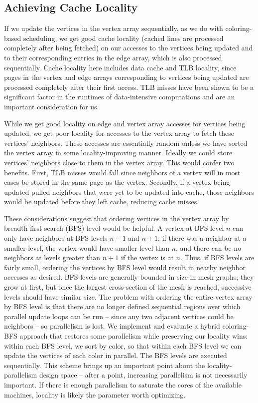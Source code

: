 \subsection{Achieving Cache Locality}
If we update the vertices in the vertex array sequentially, as we do with coloring-based scheduling, we get good cache locality (cached lines are processed completely after being fetched) on our accesses to the vertices being updated and to their corresponding entries in the edge array, which is also processed sequentially. Cache locality here includes data cache and TLB locality, since pages in the vertex and edge arrays corresponding to vertices being updated are processed completely after their first access. TLB misses have been shown to be a significant factor in the runtimes of data-intensive computations and are an important consideration for us.

While we get good locality on edge and vertex array accesses for vertices being updated, we get poor locality for accesses to the vertex array to fetch these vertices' neighbors. These accesses are essentially random unless we have sorted the vertex array in some locality-improving manner. Ideally we could store vertices' neighbors close to them in the vertex array. This would confer two benefits. First, TLB misses would fall since neighbors of a vertex will in most cases be stored in the same page as the vertex. Secondly, if a vertex being updated pulled neighbors that were yet to be updated into cache, those neighbors would be updated before they left cache, reducing cache misses.

These considerations suggest that ordering vertices in the vertex array by breadth-first search (BFS) level would be helpful. A vertex at BFS level $n$ can only have neighbors at BFS levels $n-1$ and $n+1$; if there was a neighbor at a smaller level, the vertex would have smaller level than $n$, and there can be no neighbors at levels greater than $n+1$ if the vertex is at $n$. Thus, if BFS levels are fairly small, ordering the vertices by BFS level would result in nearby neighbor accesses as desired. BFS levels are generally bounded in size in mesh graphs; they grow at first, but once the largest cross-section of the mesh is reached, successive levels should have similar size. The problem with ordering the entire vertex array by BFS level is that there are no longer defined sequential regions over which parallel update loops can be run -- since any two adjacent vertices could be neighbors -- so parallelism is lost. We implement and evaluate a hybrid coloring-BFS approach that restores some parallelism while preserving our locality wins: within each BFS level, we sort by color, so that within each BFS level we can update the vertices of each color in parallel. The BFS levels are executed sequentially. This scheme brings up an important point about the locality-parallelism design space -- after a point, increasing parallelism is not necessarily important. If there is enough parallelism to saturate the cores of the available machines, locality is likely the parameter worth optimizing.

